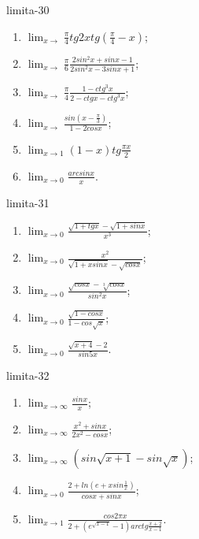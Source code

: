 \begin{defproblem}{limita-30}
\begin{multicols}{2}
\begin{enumerate}
    \item $\lim_{{x \rightarrow}} \frac{\pi}{4} tg 2x tg(\frac{\pi}{4}-x)$;
    \item $\lim_{{x \rightarrow}} \frac{\pi}{6} \frac{2 sin^2 x +sin x -1}{2 sin^2 x - 3 sin x + 1}$;
    \item $\lim_{{x \rightarrow}} \frac{\pi}{4}  \frac{1-ctg^3 x}{2- ctg x - ctg^3 x}$;
    \item $\lim_{{x \rightarrow}} \frac{sin(x-\frac{\pi}{3})}{1-2cos x}$;
    \item $\lim_{{x \rightarrow 1}} (1-x) tg \frac{\pi x}{2}$
    \item $\lim_{x \rightarrow 0} \frac{arcsin x}{x}$.
\end{enumerate}
\end{multicols}
\end{defproblem}

\begin{defproblem}{limita-31}
\begin{multicols}{2}
\begin{enumerate}
    \item $\lim_{{x \rightarrow 0}} \frac{\sqrt{1+tg x}-\sqrt{1+sin x}}{x^3}$;
    \item $\lim_{{x \rightarrow 0}} \frac{x^2}{\sqrt{1+x sin x}-\sqrt{cos x}}$;
    \item $\lim_{{x \rightarrow 0}} \frac{\sqrt{cos x}-\sqrt[3]{cos x}}{sin^2 x}$;
    \item $\lim_{{x \rightarrow 0}} \frac{\sqrt{1-cos x}}{1-cos \sqrt{x}}$;
    \item $\lim_{{x \rightarrow 0}} \frac{\sqrt{x+4}-2}{sin 5x}$.
\end{enumerate}
\end{multicols}
\end{defproblem}

\begin{defproblem}{limita-32}
\begin{multicols}{2}
\begin{enumerate}
    \item $\lim_{{x \rightarrow \infty}} \frac{sin x}{x}$;
    \item $\lim_{{x \rightarrow \infty}} \frac{x^2+sin x}{2x^2-cos x}$;
    \item $\lim_{{x \rightarrow \infty}} (sin \sqrt{x+1}-sin \sqrt{x})$;
    \item $\lim_{{x \rightarrow 0}} \frac{2+ln (e+x sin \frac{1}{x})}{cos x + sin x}$;
    \item $\lim_{{x \rightarrow 1}} \frac{cos 2\pi x}{2+(e^{\sqrt{x-1}}-1)arctg \frac{x+2}{x-1}}$.
\end{enumerate}
\end{multicols}
\end{defproblem}

